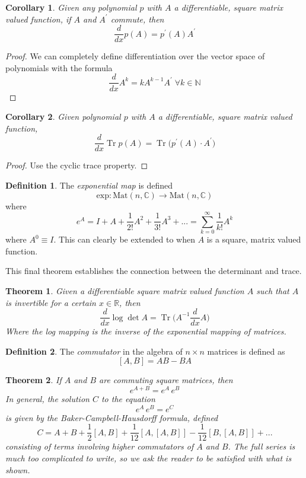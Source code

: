 \documentclass{article}
\DeclareMathOperator{\Tr}{Tr}
\newtheorem{theorem}{Theorem}[section]
\newtheorem{corollary}{Corollary}[theorem]
\theoremstyle{remark}
\theoremstyle{definition}
\newtheorem{definition}{Definition}[section]
\begin{document}
\begin{corollary}
Given any polynomial $p$ with $A$ a differentiable, square matrix valued function, if $A$ and $A^\prime$ commute, then 
\[\frac{d}{d x} p(A) = p^\prime (A) A^\prime\]
\end{corollary}
\begin{proof}
We can completely define differentiation over the vector space of polynomials with the formula
\[\frac{d}{d x} A^k = k A^{k-1} A^\prime \; \forall k \in \mathbb{N}\]
\end{proof}

\begin{corollary}
Given polynomial $p$ with $A$ a differentiable, square matrix valued function, 
\[\frac{d}{d x} \Tr{p(A)} = \Tr{\big( p^\prime(A) \cdot A^\prime \big)}\]
\end{corollary}
\begin{proof}
Use the cyclic trace property.
\end{proof}

\begin{definition}
The \textit{exponential map} is defined
\[\text{exp}: \text{Mat}(n, \mathbb{C}) \longrightarrow \text{Mat}(n, \mathbb{C})\]
where 
\[e^A = I + A + \frac{1}{2!} A^2 + \frac{1}{3!} A^3 + ... = \sum_{k=0}^\infty \frac{1}{k!} A^k\]
where $A^0 \equiv I$. This can clearly be extended to when $A$ is a square, matrix valued function. 
\end{definition}

This final theorem establishes the connection between the determinant and trace. 

\begin{theorem}
Given a differentiable square matrix valued function $A$ such that $A$ is invertible for a certain $x \in \mathbb{R}$, then 
\[\frac{d}{d x} \log{\det{A}} = \Tr \bigg( A^{-1} \frac{d}{d x} A \bigg)\]
Where the log mapping is the inverse of the exponential mapping of matrices. 
\end{theorem}

\begin{definition}
The \textit{commutator} in the algebra of $n \times n$ matrices is defined as 
\[[A, B] = A B - B A\]
\end{definition}

\begin{theorem}
If $A$ and $B$ are commuting square matrices, then 
\[e^{A + B} = e^A \, e^B\]
In general, the solution $C$ to the equation
\[e^{A} \, e^B = e^C\]
is given by the \textit{Baker-Campbell-Hausdorff formula}, defined
\[C = A + B + \frac{1}{2}[A,B] + \frac{1}{12} [A,[A,B]] - \frac{1}{12} [B,[A,B]] + ...\]
consisting of terms involving higher commutators of $A$ and $B$. The full series is much too complicated to write, so we ask the reader to be satisfied with what is shown. 
\end{theorem}
\end{document}
